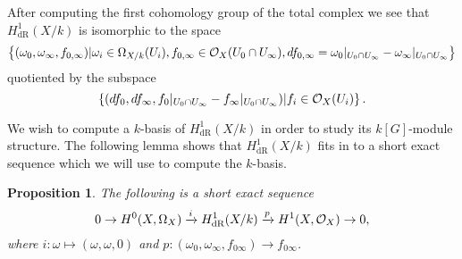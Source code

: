 \documentclass[draft, 11pt]{article} %
\theoremstyle{plain}
\newtheorem{prop}[defn]{Proposition}
\theoremstyle{remark}
\newcommand{\cO}{{\cal O}}
\newcommand{\ra}{\rightarrow}
\newcommand{\derhamhone}{H_{\text {dR}}^1(X/k)}
\begin{document}
After computing the first cohomology group of the total complex we see that $\derhamhone$ is isomorphic to the space
\begin{equation}\label{derhamconditions}
\left\{(\omega_0, \omega_\infty, f_{0,\infty}) | \omega_i\in \Omega_{X/k}(U_i), f_{0,\infty}\in \cO_X(U_0 \cap U_\infty), df_{0,\infty} = \omega_0|_{U_0\cap U_\infty} - \omega_\infty|_{U_0\cap U_\infty} \right\}
\end{equation}
quotiented by the subspace
\begin{equation}\label{quotient}
\left\{  (df_0, df_\infty, f_0|_{U_0\cap U_\infty} -f_\infty|_{U_0\cap U_\infty} )|f_i \in \cO_X(U_i)\right\}.
\end{equation}

We wish to compute a $k$-basis of $\derhamhone$ in order to study its $k[G]$-module structure.
The following lemma shows that $\derhamhone$ fits in to a short exact sequence which we will use to compute the $k$-basis.
\begin{prop}\label{ses}
The following is a short exact sequence
\begin{equation}\label{equationses}
0 \ra H^0(X,\Omega_X) \xrightarrow{i} \derhamhone \xrightarrow{p} H^1(X,\cO_X) \ra 0, 
\end{equation}
where $i \colon \omega \mapsto (\omega, \omega, 0)$ and $p \colon (\omega_0, \omega_\infty, f_{0 \infty}) \to f_{0 \infty}$.
\end{prop}
\end{document}
